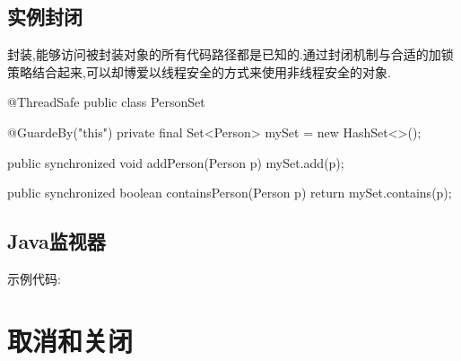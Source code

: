 \subsection{实例封闭}

封装,能够访问被封装对象的所有代码路径都是已知的.通过封闭机制与合适的加锁策略结合起来,可以却博爱以线程安全的方式来使用非线程安全的对象.

\begin{Java}
@ThreadSafe
public class PersonSet {

	@GuardeBy("this")
	private final Set<Person> mySet = new HashSet<>();
	
	public synchronized void addPerson(Person p)
	{
		mySet.add(p);
	}
	
	public synchronized boolean containsPerson(Person p)
	{
		return mySet.contains(p);
	}
}
\end{Java}


\subsection{Java监视器}


示例代码:


\begin{Java}



\end{Java}



\section{取消和关闭}

\begin{Java}




\end{Java}











